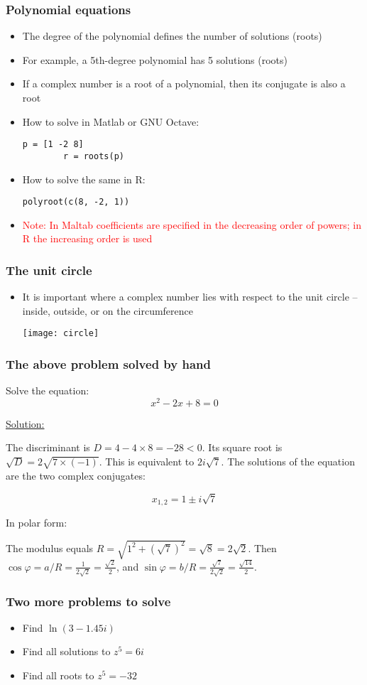 \documentclass[10pt]{beamer}
\theoremstyle{definition}
\begin{document}
\begin{frame}[fragile]
	\frametitle{Polynomial equations}
	\begin{itemize}
		\item The degree of the polynomial defines the number of solutions (roots)
		\item For example, a 5th-degree polynomial has 5 solutions (roots)
		\item If a complex number is a root of a polynomial, then its conjugate is also a root
		\item How to solve in Matlab or GNU Octave:
		\begin{lstlisting}[style = rstyle, breaklines]
		p = [1 -2 8]
		r = roots(p)
		\end{lstlisting}
		\item How to solve the same in R:
		\begin{lstlisting}[style = rstyle, breaklines]
		polyroot(c(8, -2, 1))
		\end{lstlisting}
		\item \textcolor{red}{Note: In Maltab coefficients are specified in the decreasing order of powers; in R the increasing order is used}
	\end{itemize}
\end{frame}

\begin{frame}[fragile]
	\frametitle{The unit circle}
	\begin{itemize}
		\item It is important where a complex number lies with respect to the unit circle -- inside, outside, or on the circumference
		\centerline{\texttt{[image: circle]}}
	\end{itemize}
\end{frame}

\begin{frame}[fragile]
	\frametitle{The above problem solved by hand}
	Solve the equation:
	\[
	x^{2} - 2x + 8 = 0
	\]
	
	\underline{Solution:}
	
	The discriminant is $D = 4 - 4\times 8 = -28 < 0$. Its square root is $\sqrt{D} = 2\sqrt{7\times (-1)}$. This is equivalent to $2i\sqrt{7}$. The solutions of the equation are the two complex conjugates:
	
	\[
	x_{1,2} = 1 \pm i\sqrt{7}
	\]
	
	In polar form:
	
	The modulus equals $R = \sqrt{1^2 +(\sqrt{7})^{2}} = \sqrt{8} = 2\sqrt{2}$. Then $\cos\varphi = a/R = \displaystyle\frac{1}{2\sqrt{2}} = \frac{\sqrt{2}}{2}$, and $\sin\varphi = b/R = \displaystyle\frac{\sqrt{7}}{2\sqrt{2}} = \frac{\sqrt{14}}{2}$. 
\end{frame}

\begin{frame}[fragile]
	\frametitle{Two more problems to solve}
	\begin{itemize}
		\item Find $\ln(3 - 1.45i)$
		\item Find all solutions to $z^{5} = 6i$ 
		\item Find all roots to $z^{5} = -32$ 
	\end{itemize}
\end{frame}
\end{document}
